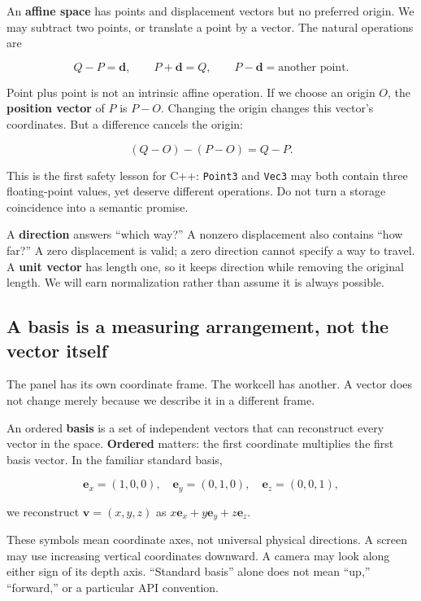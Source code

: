 An \textbf{affine space} has points and displacement vectors but no preferred origin. We may subtract two points, or translate a point by a vector. The natural operations are

\[
Q-P=\mathbf d,\qquad P+\mathbf d=Q,\qquad P-\mathbf d=\text{another point}.
\]

Point plus point is not an intrinsic affine operation. If we choose an origin \(O\), the \textbf{position vector} of \(P\) is \(P-O\). Changing the origin changes this vector's coordinates. But a difference cancels the origin:

\[
(Q-O)-(P-O)=Q-P.
\]

This is the first safety lesson for C++: \texttt{Point3} and \texttt{Vec3} may both contain three floating-point values, yet deserve different operations. Do not turn a storage coincidence into a semantic promise.

A \textbf{direction} answers ``which way?'' A nonzero displacement also contains ``how far?'' A zero displacement is valid; a zero direction cannot specify a way to travel. A \textbf{unit vector} has length one, so it keeps direction while removing the original length. We will earn normalization rather than assume it is always possible.

\subsection{A basis is a measuring arrangement, not the vector itself}\label{01-foundations-i-ch017-a-basis-is-a-measuring-arrangement-not-the-vector-itself}

The panel has its own coordinate frame. The workcell has another. A vector does not change merely because we describe it in a different frame.

An ordered \textbf{basis} is a set of independent vectors that can reconstruct every vector in the space. \textbf{Ordered} matters: the first coordinate multiplies the first basis vector. In the familiar standard basis,

\[
\mathbf e_x=(1,0,0),\quad
\mathbf e_y=(0,1,0),\quad
\mathbf e_z=(0,0,1),
\]

we reconstruct \(\mathbf v=(x,y,z)\) as \(x\mathbf e_x+y\mathbf e_y+z\mathbf e_z\).

These symbols mean coordinate axes, not universal physical directions. A screen may use increasing vertical coordinates downward. A camera may look along either sign of its depth axis. ``Standard basis'' alone does not mean ``up,'' ``forward,'' or a particular API convention.

